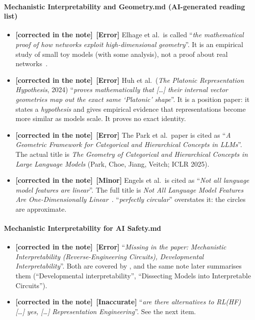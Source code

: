 \documentclass[11pt,a4paper]{article}
\newcommand{\note}[1]{\textsf{#1}}                 %
\newcommand{\sev}[1]{\textbf{[#1]}}                 %
\newcommand{\claim}[1]{\enquote{\textit{#1}}}       %
\newcommand{\fixed}{\textbf{\textcolor{green!50!black}{[corrected in the note]}}} %
\begin{document}
\paragraph{\note{Mechanistic Interpretability and Geometry.md} (AI-generated reading list)}
\begin{itemize}
  \item \fixed\ \sev{Error} Elhage et al.\ is called \claim{the mathematical proof of
    how networks exploit high-dimensional geometry}. It is an empirical study
    of small toy models (with some analysis), not a proof about real
    networks~\cite{elhage2022toy}.
  \item \fixed\ \sev{Error} Huh et al.\ (\emph{The Platonic Representation
    Hypothesis}, 2024) \claim{proves mathematically that [\dots] their
    internal vector geometries map out the exact same \enquote{Platonic}
    shape}. It is a position paper: it states a \emph{hypothesis} and gives
    empirical evidence that representations become more similar as models
    scale. It proves no exact identity.
  \item \fixed\ \sev{Error} The Park et al.\ paper is cited as \claim{A Geometric
    Framework for Categorical and Hierarchical Concepts in LLMs}. The actual
    title is \emph{The Geometry of Categorical and Hierarchical Concepts in
    Large Language Models} (Park, Choe, Jiang, Veitch; ICLR 2025).
  \item \fixed\ \sev{Minor} Engels et al.\ is cited as \claim{Not all language model
    features are linear}. The full title is \emph{Not All Language Model
    Features Are One-Dimensionally Linear}~\cite{engels2025notall}.
    \claim{perfectly circular} overstates it: the circles are approximate.
\end{itemize}

\paragraph{\note{Mechanistic Interpretability for AI Safety.md}}
\begin{itemize}
  \item \fixed\ \sev{Error} \claim{Missing in the paper: Mechanistic
    Interpretability (Reverse-Engineering Circuits), Developmental
    Interpretability}. Both are covered by \textcite{bereska2024review}, and
    the same note later summarises them (\enquote{Developmental
    interpretability}, \enquote{Dissecting Models into Interpretable
    Circuits}).
  \item \fixed\ \sev{Inaccurate} \claim{are there alternatives to RL(HF) [\dots]
    yes, [\dots] Representation Engineering}. See the next item.
\end{itemize}
\end{document}
